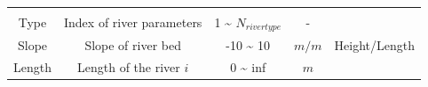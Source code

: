 \documentclass[]{scrbook}
\begin{document}
\begin{longtable}[]{@{}ccccc@{}}
\begin{minipage}[t]{0.29\columnwidth}
\end{minipage}\tabularnewline
\begin{minipage}[t]{0.11\columnwidth}\centering\strut
Type\strut
\end{minipage} & \begin{minipage}[t]{0.25\columnwidth}\centering\strut
Index of river parameters\strut
\end{minipage} & \begin{minipage}[t]{0.11\columnwidth}\centering\strut
1 \textasciitilde{} \(N_{rivertype}\)\strut
\end{minipage} & \begin{minipage}[t]{0.11\columnwidth}\centering\strut
-\strut
\end{minipage} & \begin{minipage}[t]{0.29\columnwidth}\centering\strut
\strut
\end{minipage}\tabularnewline
\begin{minipage}[t]{0.11\columnwidth}\centering\strut
Slope\strut
\end{minipage} & \begin{minipage}[t]{0.25\columnwidth}\centering\strut
Slope of river bed\strut
\end{minipage} & \begin{minipage}[t]{0.11\columnwidth}\centering\strut
-10 \textasciitilde{} 10\strut
\end{minipage} & \begin{minipage}[t]{0.11\columnwidth}\centering\strut
\(m/m\)\strut
\end{minipage} & \begin{minipage}[t]{0.29\columnwidth}\centering\strut
Height/Length\strut
\end{minipage}\tabularnewline
\begin{minipage}[t]{0.11\columnwidth}\centering\strut
Length\strut
\end{minipage} & \begin{minipage}[t]{0.25\columnwidth}\centering\strut
Length of the river \(i\)\strut
\end{minipage} & \begin{minipage}[t]{0.11\columnwidth}\centering\strut
0 \textasciitilde{} inf\strut
\end{minipage} & \begin{minipage}[t]{0.11\columnwidth}\centering\strut
\(m\)\strut
\end{minipage} & \begin{minipage}[t]{0.29\columnwidth}\centering\strut
\strut
\end{minipage}\tabularnewline
\bottomrule
\end{longtable}
\end{document}
